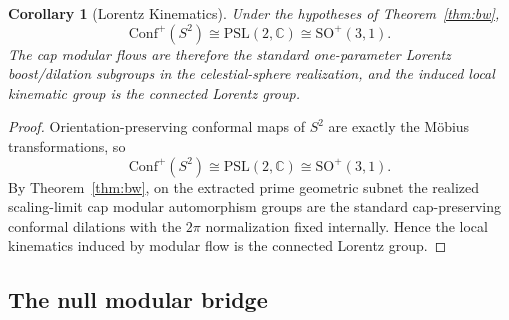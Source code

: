 \documentclass[11pt]{article}
\newtheorem{corollary}[theorem]{Corollary}
\newcommand{\Conf}{\mathrm{Conf}}
\begin{document}
\begin{corollary}[Lorentz Kinematics]\label{cor:lorentz}
Under the hypotheses of Theorem~\ref{thm:bw},
\[
\Conf^+(S^2)\cong \mathrm{PSL}(2,\mathbb C)\cong \mathrm{SO}^+(3,1).
\]
The cap modular flows are therefore the standard one-parameter Lorentz boost/dilation subgroups in the celestial-sphere realization, and the induced local kinematic group is the connected Lorentz group.
\end{corollary}

\begin{proof}
Orientation-preserving conformal maps of \(S^2\) are exactly the M\"obius transformations, so
\[
\Conf^+(S^2)\cong \mathrm{PSL}(2,\mathbb C)\cong \mathrm{SO}^+(3,1).
\]
By Theorem~\ref{thm:bw}, on the extracted prime geometric subnet the realized scaling-limit cap modular automorphism groups are the standard cap-preserving conformal dilations with the \(2\pi\) normalization fixed internally. Hence the local kinematics induced by modular flow is the connected Lorentz group.
\end{proof}
\subsection{The null modular bridge}
\end{document}
